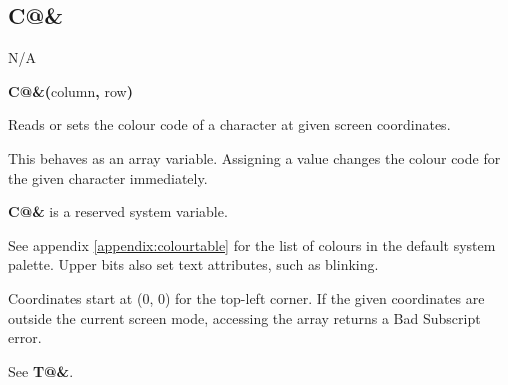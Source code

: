 \subsection{C@\&}
\begin{description}[leftmargin=2cm,style=nextline]
\item [Token:]   N/A

\item [Format:]  {\bf C@\&(}column{\bf ,} row{\bf)}

\item [Usage:]   Reads or sets the colour code of a character at given screen coordinates.

                 This behaves as an array variable. Assigning a value changes the colour code for the given character immediately.

\item[Remarks:]  {\bf C@\&} is a reserved system variable.

                 See appendix \vref{appendix:colourtable} for the list of colours in the default system palette. Upper bits also set text attributes, such as blinking.

                 Coordinates start at (0, 0) for the top-left corner. If the given coordinates are outside the current screen mode, accessing the array returns a Bad Subscript error.

\item [Example:] See {\bf T@\&}.
\end{description}


\newpage
